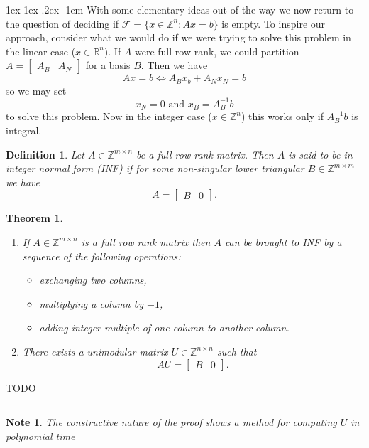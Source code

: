 \documentclass[11pt]{article}
\makeatletter
\renewcommand\paragraph{\@startsection{paragraph}{4}{0mm}%
                                    {1ex \@plus1ex \@minus.2ex}%
                                    {-1em}%
                                    {\normalfont\normalsize\bfseries}}
\newenvironment{proof}{{\bf Proof:  }}{\hfill\rule{2mm}{2mm}}
\newtheorem{theorem}[fact]{Theorem}
\newtheorem{definition}[fact]{Definition}
\newtheorem{note}[fact]{Note}
\newcommand{\R}{\ensuremath{\mathbb R}}
\newcommand{\Z}{\ensuremath{\mathbb Z}}
\makeatother
\begin{document}
\paragraph{}
With some elementary ideas out of the way we now return to the question of deciding if $\mathcal{F} = \{x \in \Z^n : Ax = b\}$ is empty. To inspire our approach, consider what we would do if we were trying to solve this problem in the linear case ($x \in \R^n$). If $A$ were full row rank, we could partition $A = \begin{bmatrix} A_B & A_N \end{bmatrix}$ for a basis $B$. Then we have
$$
Ax = b \iff A_Bx_b + A_N x_N = b
$$
so we may set 
$$ x_N = 0 \text{ and } x_B = A_B^{-1}b $$
to solve this problem. Now in the integer case ($x \in \Z^n$) this works only if $A_B^{-1}b$ is integral.
\begin{definition}
Let $A \in \Z^{m \times n}$ be a full row rank matrix. Then $A$ is said to be in integer normal form (INF) if for some non-singular lower triangular $B \in \Z^{m \times m}$ we have
$$ A = \begin{bmatrix} B & 0 \end{bmatrix}.$$
\end{definition}
\begin{theorem}
\begin{enumerate}
\item If $A \in \Z^{m \times n}$ is a full row rank matrix then $A$ can be brought to INF by a sequence of the following operations:
\begin{itemize}
\item exchanging two columns,
\item multiplying a column by $-1$,
\item adding integer multiple of one column to another column.
\end{itemize}
\item There exists a unimodular matrix $U \in \Z^{n \times n}$ such that $$AU = \begin{bmatrix} B & 0 \end{bmatrix}.$$
\end{enumerate}
\end{theorem}
\begin{proof}
TODO
\end{proof}
\begin{note}
The constructive nature of the proof shows a method for computing $U$ in polynomial time
\end{note}
\end{document}
